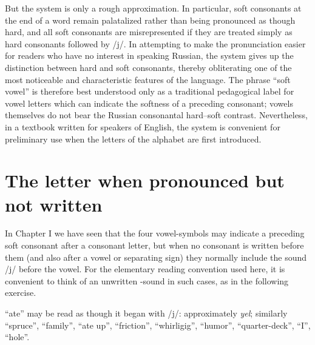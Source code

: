 But the system is only a rough approximation. In particular, soft consonants at the end of a word remain palatalized rather than being pronounced as though hard, and all soft consonants are misrepresented if they are treated simply as hard consonants followed by /j/. In attempting to make the pronunciation easier for readers who have no interest in speaking Russian, the system gives up the distinction between hard and soft consonants, thereby obliterating one of the most noticeable and characteristic features of the language. The phrase ``soft vowel'' is therefore best understood only as a traditional pedagogical label for vowel letters which can indicate the softness of a preceding consonant; vowels themselves do not bear the Russian consonantal hard--soft contrast. Nevertheless, in a textbook written for speakers of English, the system is convenient for preliminary use when the letters of the alphabet are first introduced.

\section{The letter  when pronounced but not written}

In Chapter I we have seen that the four vowel-symbols  may indicate a preceding soft consonant after a consonant letter, but when no consonant is written before them (and also after a vowel or separating sign) they normally include the sound /j/ before the vowel. For the elementary reading convention used here, it is convenient to think of an unwritten -sound in such cases, as in the following exercise.

\begin{keybox}[Exercise 2.3]
 ``ate'' may be read as though it began with /j/: approximately \emph{yel}; similarly  ``spruce'',  ``family'',  ``ate up'',  ``friction'',  ``whirligig'',  ``humor'',  ``quarter-deck'',  ``I'',  ``hole''.
\end{keybox}

